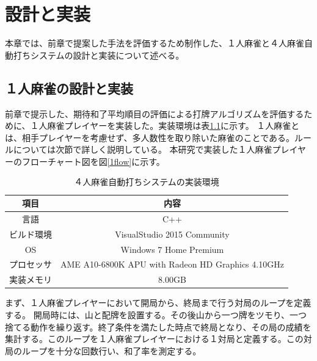 \chapter{設計と実装}
\label{chap:implementation}

本章では、前章で提案した手法を評価するため制作した、１人麻雀と４人麻雀自動打ちシステムの設計と実装について述べる。

\section{１人麻雀の設計と実装}
前章で提示した、期待和了平均順目の評価による打牌アルゴリズムを評価するために、１人麻雀プレイヤーを実装した。実装環境は表\ref{imp2}に示す。
１人麻雀とは、相手プレイヤーを考慮せず、多人数性を取り除いた麻雀のことである。ルールについては次節で詳しく説明している。
本研究で実装した１人麻雀プレイヤーのフローチャート図を図\ref{1flow}に示す。

\begin{table}[h]
  \caption{４人麻雀自動打ちシステムの実装環境}
  \label{imp2}
  \begin{center}
  \begin{tabular}{c|c}
    \hline
    項目  & 内容 \\\hline\hline
    言語  & C++ \\\hline
    ビルド環境  & VisualStudio 2015 Community\\\hline
    OS & Windows 7 Home Premium \\\hline
    プロセッサ & AME A10-6800K APU with Radeon HD Graphics 4.10GHz\\\hline
    実装メモリ & 8.00GB\\\hline
  \end{tabular}\end{center}
\end{table}

まず、１人麻雀プレイヤーにおいて開局から、終局まで行う対局のループを定義する。
開局時には、山と配牌を設置する。その後山から一つ牌をツモり、一つ捨てる動作を繰り返す。終了条件を満たした時点で終局となり、その局の成績を集計する。このループを１人麻雀プレイヤーにおける１対局と定義する。この対局のループを十分な回数行い、和了率を測定する。

